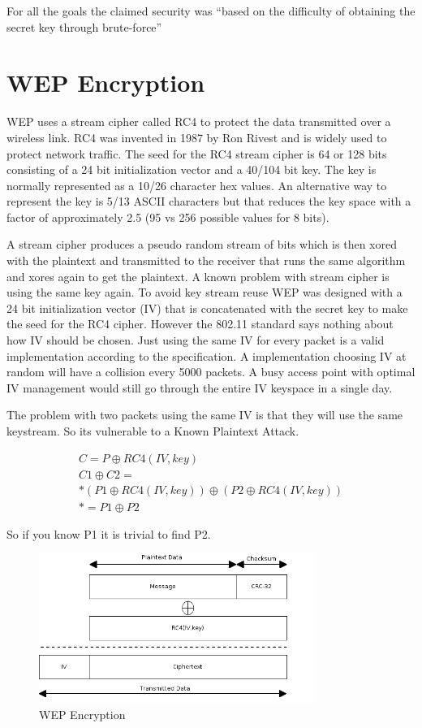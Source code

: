 \documentclass[twocolumn,11pt]{IEEEtran}
\begin{document}
For all the goals the claimed security was ``based on the difficulty of obtaining the secret key through brute-force''\cite{IEEE:Fast}



\section {WEP Encryption}
\label{sec:WEP_Encryption}

WEP uses a stream cipher called RC4 to protect the data transmitted over a wireless link. RC4 was invented in 1987 by Ron Rivest and is widely used to protect network traffic. The seed for the RC4 stream cipher is 64 or 128 bits consisting of a 24 bit initialization vector and a 40/104 bit key. The key is normally represented as a 10/26 character hex values. An alternative way to represent the key is 5/13 ASCII characters but that reduces the key space with a factor of approximately 2.5 (95 vs 256 possible values for 8 bits).

A stream cipher produces a pseudo random stream of bits which is then xored with the plaintext and transmitted to the receiver that runs the same algorithm and xores again to get the plaintext. A known problem with stream cipher is using the same key again. To avoid key stream reuse WEP was designed with a 24 bit initialization vector (IV) that is concatenated with the secret key to make the seed for the RC4 cipher. However the 802.11 standard says nothing about how IV should be chosen. Just using the same IV for every packet is a valid implementation according to the specification. A implementation choosing IV at random will have a collision every 5000 packets\cite{Borisov:New}. A busy access point with optimal IV management would still go through the entire IV keyspace in a single day.

The problem with two packets using the same IV is that they will use the same keystream. So its vulnerable to a Known Plaintext Attack.


\begin{align*}
C = P \oplus RC4(IV,key) \\
C1 \oplus C2 = \\*
(P1 \oplus RC4(IV,key) ) \oplus ( P2 \oplus RC4(IV,key)) \\*
= P1 \oplus P2
\end{align*}

So if you know P1 it is trivial to find P2. 

\begin{figure}
\includegraphics[width=90mm]{WEP_Encryption.png}
\caption{WEP Encryption}
\end{figure}
\end{document}

